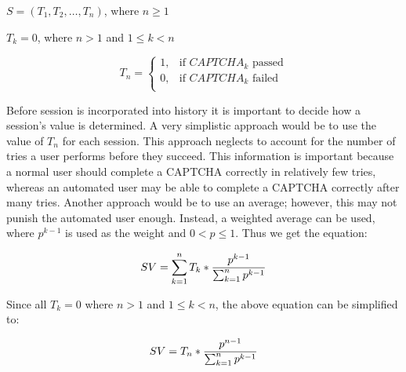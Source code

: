 \documentclass[journal, 12pt, onecolumn, draftclsnofoot]{IEEEtran}
\begin{document}
$S=(T_1,T_2,\ldots,T_n )$, where $n \geq 1$

$T_k = 0$, where $n > 1$ and $1 \leq k < n$

\[
T_n =
  \begin{cases}
    1, &\text{if $CAPTCHA_k$ passed}\\
    0, &\text{if $CAPTCHA_k$ failed}\\
  \end{cases}
\]

Before session is incorporated into history it is important to decide how a session’s value is determined. A very simplistic approach would be to use the value of $T_n$ for each session. This approach neglects to account for the number of tries a user performs before they succeed. This information is important because a normal user should complete a CAPTCHA correctly in relatively few tries, whereas an automated user may be able to complete a CAPTCHA correctly after many tries. Another approach would be to use an average; however, this may not punish the automated user enough. Instead, a weighted average can be used, where $p^{k-1}$ is used as the weight and $0 < p \leq 1$. Thus we get the equation:

\[
  SV =
    \sum_{k=1}^n T_k * {
      p^{k-1} \over \sum_{k=1}^n p^{k-1}
    }
\]

  Since all $T_k = 0$ where $n > 1$ and $1 \leq k < n$, the above equation can be simplified to:

\[
  SV =
    T_n * {
      p^{n - 1} \over \sum_{k=1}^n p^{k-1}
    }
\]

\newpage



\end{document}
